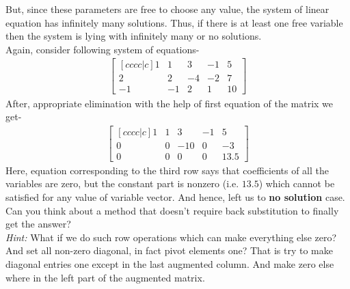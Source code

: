 \documentclass{article}
\begin{document}
But, since these parameters are free to choose any value, the system of linear equation has infinitely many solutions. Thus, if there is at least one free variable then the system is lying with infinitely many or no solutions.\\

Again, consider following system of equations-\\
\begin{align}
\begin{bmatrix}[cccc|c] 
1 & 1 & 3 & -1 & 5 \\
2 & 2 & -4 & -2 & 7 \\
-1 & -1 & 2 & 1 & 10 
\end{bmatrix}\nonumber
\end{align}
After, appropriate elimination with the help of first equation of the matrix we get-
\begin{align}
\begin{bmatrix}[cccc|c] 
1 & 1 & 3 & -1 & 5 \\
0 & 0 & -10 & 0 & -3 \\
0 & 0 & 0 & 0 & 13.5 
\end{bmatrix}\nonumber
\end{align}
Here, equation corresponding to the third row says that coefficients of all the variables are zero, but the constant part is nonzero (i.e. $13.5$) which cannot be satisfied for any value of variable vector. And hence, left us to \textbf{no solution} case.\\
Can you think about a method that doesn't require back substitution to finally get the answer?\\
\textit{Hint:} What if we do such row operations which can make everything else zero? And set all non-zero diagonal, in fact pivot elements one? That is try to make diagonal entries one except in the last augmented column. And make zero else where in the left part of the augmented matrix.\\
\end{document}
